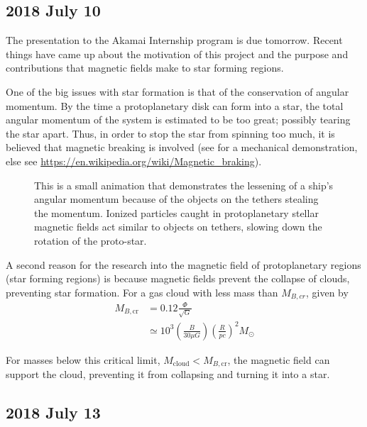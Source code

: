 \documentclass[twocolumn]{article}
\begin{document}
\subsection{2018 July 10}
\label{subsec:2018_July_10}

The presentation to the Akamai Internship program is due tomorrow. Recent things have came up about the motivation of this project and the purpose and contributions that magnetic fields make to star forming regions.

One of the big issues with star formation is that of the conservation of angular momentum. By the time a protoplanetary disk can form into a star, the total angular momentum of the system is estimated to be too great; possibly tearing the star apart. Thus, in order to stop the star from spinning too much, it is believed that magnetic breaking is involved (see  for a mechanical demonstration, else see \url{https://en.wikipedia.org/wiki/Magnetic_braking}).

\begin{figure}
	\caption{This is a small animation that demonstrates the lessening of a ship's angular momentum because of the objects on the tethers stealing the momentum. Ionized particles caught in protoplanetary stellar magnetic fields act similar to objects on tethers, slowing down the rotation of the proto-star.}
	\label{fig:yoyo_despin_animation}
\end{figure}

A second reason for the research into the magnetic field of protoplanetary regions (star forming regions) is because magnetic fields prevent the collapse of clouds, preventing star formation. For a gas cloud with less mass than $M_{B,cr}$, given by
\begin{align*}
	M_{B,\text{cr}} &= 0.12 \frac{\Phi}{\sqrt{G}} \\ 
	& \simeq 10^3 \left( \frac{B}{30 \mu G} \right) \left( \frac{R}{pc} \right)^2 M_{\odot}
\end{align*}

For masses below this critical limit, $M_\text{cloud} < M_{B,\text{cr}}$, the magnetic field can support the cloud, preventing it from collapsing and turning it into a star. 


\subsection{2018 July 13}
\label{subsec:2018_July_13}
\end{document}
